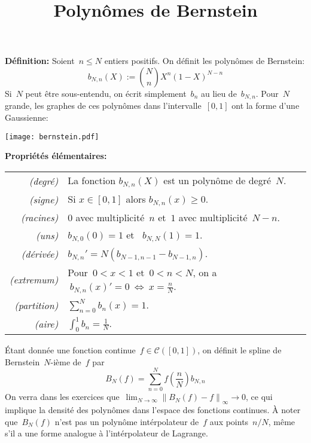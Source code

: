 \title{Polynômes de Bernstein}

{\bf Définition:}
Soient~$n\le N$ entiers positifs.  On définit les polynômes de Bernstein:
\[
b_{N,n}(X) := {N\choose n}X^n(1-X)^{N-n}
\]
Si~$N$ peut être sous-entendu, on écrit simplement~$b_n$ au lieu de~$b_{N,n}$.
Pour~$N$ grande, les graphes de ces polynômes dans l'intervalle~$[0,1]$ ont la
forme d'une Gaussienne:

\texttt{[image: bernstein.pdf]}

{\bf Propriétés élémentaires:}

\begin{tabular}{rl}
	\it (degré) & La fonction $b_{N,n}(X)$ est un polynôme de degré~$N$.\\
	\it (signe) & Si $x\in[0,1]$ alors $\displaystyle b_{N,n}(x)\ge 0$.\\
	\it (racines) & $0$ avec multiplicité~$n$ et~$1$ avec multiplicité~$N-n$.\\
	\it (uns)& $\displaystyle b_{N,0}(0)=1$ et ~$b_{N,N}(1)=1$.\\
	\it (dérivée)& $\displaystyle {b_{N,n}}'=N\left(b_{N-1,n-1}-b_{N-1,n}\right)$.\\
	\it (extremum)& Pour~$0<x<1$ et~$0<n<N$, on a
	$\displaystyle\ b_{N,n}(x)'=0\ \iff\ x=\frac{n}{N}$.\\
	\it (partition)& $\displaystyle\sum_{n=0}^Nb_n(x)=1$.\\
	\it (aire)& $\displaystyle\int_0^1b_n=\frac{1}{N}$.\\
\end{tabular}

Étant donnée une fonction continue~$f\in\mathcal{C}\left([0,1]\right)$, on
définit le spline de Bernstein~$N$-ième de~$f$ par
\[
	B_N(f) = \sum_{n=0}^Nf\left(\frac nN\right)b_{N,n}
\]
On verra dans les exercices
que~$\lim_{N\to\infty}\left\|B_N(f)-f\right\|_\infty\to0$, ce qui implique la
densité des polynômes dans l'espace des fonctions continues.  À noter
que~$B_N(f)$ n'est pas un polynôme intérpolateur de~$f$ aux points~$n/N$, même
s'il a une forme analogue à l'intérpolateur de Lagrange.



